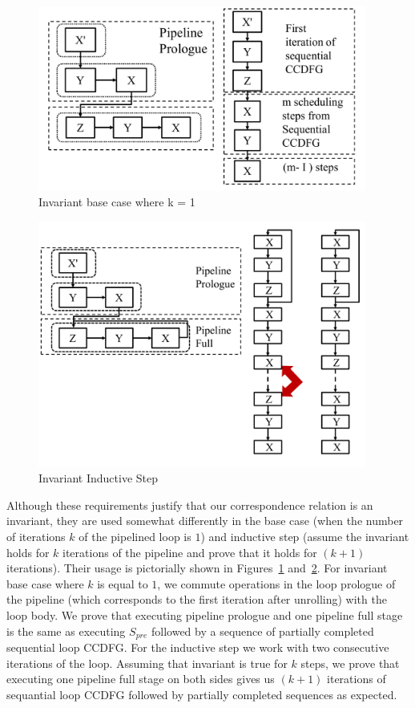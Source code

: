 \begin{figure}[t!]
\begin{center}
\includegraphics[width=4.25in]{fig-proposal/invariant-base-case}
\end{center}
\caption{Invariant base case where k = 1}
\label{fig:invariant-base-case}
\end{figure}

\begin{figure}[t!]
\begin{center}
\includegraphics[width=4.25in]{fig-proposal/invariant-inductive-step}
\end{center}
\caption{Invariant Inductive Step}
\label{fig:invariant-inductive-step}
\end{figure}

Although these requirements justify that our correspondence
relation is an invariant, they are used somewhat differently
in the base case (when the number of iterations $k$ of the
pipelined loop is $1$) and inductive step (assume the
invariant holds for $k$ iterations of the pipeline and prove
that it holds for $(k+ 1)$ iterations).  Their usage is
pictorially shown in Figures~\ref{fig:invariant-base-case}
and~\ref{fig:invariant-inductive-step}. For invariant base case where $k$ is
equal to $1$, we commute operations in the loop prologue of
the pipeline (which corresponds to the first iteration after
unrolling) with the loop body. We prove that executing
  pipeline prologue and one pipeline full stage is the same
  as executing $S_{pre}$ followed by a sequence of partially
  completed sequential loop CCDFG. For the inductive step
we work with two consecutive iterations of the loop. Assuming that
  invariant is true for $k$ steps, we prove that executing one pipeline full
  stage on both sides gives us $(k + 1)$ iterations of
  sequantial loop CCDFG followed by partially completed
  sequences as expected.

